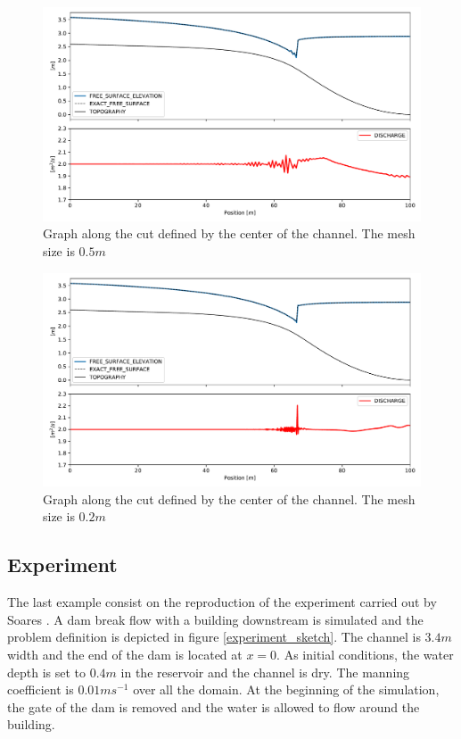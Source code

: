 \documentclass[a4paper,12pt]{article}
\begin{document}
\begin{figure}
    \centering
    \includegraphics[width=\textwidth]{img/jump/mesh_0.5.pdf}
    \caption{Graph along the cut defined by the center of the channel. The mesh size is $0.5m$}
    \label{mac_donald_shock_graph_5}
\end{figure}

\begin{figure}
    \centering
    \includegraphics[width=\textwidth]{img/jump/mesh_0.2.pdf}
    \caption{Graph along the cut defined by the center of the channel. The mesh size is $0.2m$}
    \label{mac_donald_shock_graph_2}
\end{figure}


\subsection{Experiment}

The last example consist on the reproduction of the experiment carried out by Soares \cite{soares2007}. A dam break flow with a building downstream is simulated and the problem definition is depicted in figure \ref{experiment_sketch}. The channel is $3.4m$ width and the end of the dam is located at $x=0$. As initial conditions, the water depth is set to $0.4m$ in the reservoir and the channel is dry. The manning coefficient is $0.01ms^{-1}$ over all the domain. At the beginning of the simulation, the gate of the dam is removed and the water is allowed to flow around the building.
\end{document}
